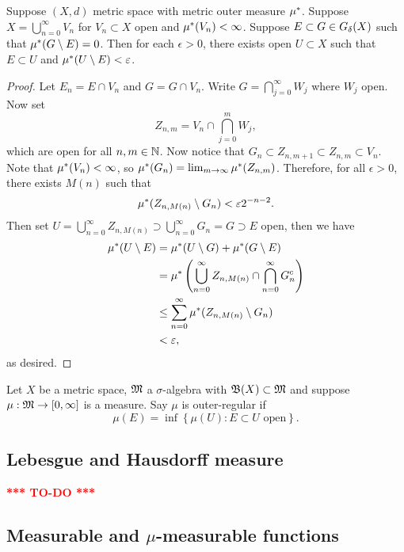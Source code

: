 \documentclass[a4paper]{article}
\newcommand{\TODO}{\textcolor{red}{\textbf{*** TO-DO ***}}}
\renewcommand{\cupinfn}{\bigcup_{n=0}^\infty}
\renewcommand{\capinfn}{\bigcap_{n=0}^\infty}
\renewcommand{\suminfn}{\sum_{n=0}^\infty}
\begin{document}
\begin{lemma}
Suppose $(X, d)$ metric space with metric outer measure
$\mu^*$. Suppose $X = \cupinfn V_n$ for $V_n \subset X$ open and
$\mu^*(V_n) < \infty$. Suppose $E \subset G \in G_\delta(X)$ such that
$\mu^*(G \setminus E) = 0$. Then for each $\epsilon > 0$,
there exists open $U \subset X$ such that $E \subset U$
and $\mu^*(U \setminus E) < \varepsilon$.

\end{lemma}

\begin{proof}

Let $E_n = E \cap V_n$ and $G = G \cap V_n$. Write
$G = \bigcap_{j=0}^\infty W_j$ where $W_j$ open.
Now set
\[
Z_{n, m} = V_n \cap \bigcap_{j=0}^m W_j,
\]
which are open for all $n, m \in \mathbb{N}$.
Now notice that $G_n \subset Z_{n, m+1} \subset Z_{n,m}
\subset V_n$. Note that $\mu^*(V_n) < \infty$, so
$\mu^*(G_n) = \lim_{m \to \infty} \mu^*(Z_{n, m})$. Therefore,
for all $\epsilon > 0$, there exists $M(n)$ such that
\[
\mu^*(Z_{n, M(n)} \setminus G_n) < \varepsilon 2^{-n-2}.
\]
Then set $U = \cupinfn Z_{n, M(n)} \supset \cupinfn G_n = G
\supset E$ open, then we have
\[
\begin{aligned}
\om(U \setminus E)
&= \om(U \setminus G) + \om(G \setminus E)  \\
&= \om \left( \cupinfn Z_{n, M(n)} \cap
\capinfn G_n^c \right) \\
&\leq \suminfn \om(Z_{n, M(n)} \setminus G_n) \\
&< \epsilon,
\end{aligned}
\]
as desired.

\end{proof}


\begin{defi}
  Let $X$ be a metric space, $\mathfrak{M}$ a $\sigma$-algebra
  with $\mathfrak{B}(X) \subset \mathfrak{M}$ and suppose $\mu: \mathfrak{M} \to [0, \infty]$
  is a measure. Say $\mu$ is outer-regular if
  \[
  \mu(E) = \inf \left\{ \mu(U) : E \subset U \text{ open} \right\}.
  \]
\end{defi}


\subsection{Lebesgue and Hausdorff measure}

\TODO

\subsection{Measurable and $\mu$-measurable functions}
\end{document}
